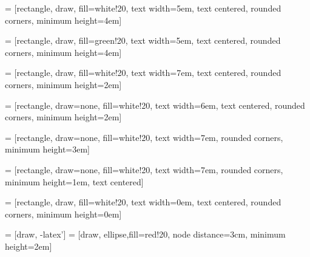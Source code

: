 \documentclass{article}
\begin{document}
\pagestyle{empty}



 = [rectangle, draw, fill=white!20, 
    text width=5em, text centered, rounded corners, minimum height=4em]

 = [rectangle, draw, fill=green!20, 
text width=5em, text centered, rounded corners, minimum height=4em]
    
 = [rectangle, draw, fill=white!20, 
text width=7em, text centered, rounded corners, minimum height=2em]

 = [rectangle, draw=none, fill=white!20, 
text width=6em, text centered, rounded corners, minimum height=2em]

 = [rectangle, draw=none, fill=white!20, 
text width=7em, rounded corners, minimum height=3em] %

 = [rectangle, draw=none, fill=white!20, 
text width=7em, rounded corners, minimum height=1em, text centered] %



 = [rectangle, draw, fill=white!20, 
text width=0em, text centered, rounded corners, minimum height=0em]


 = [draw, -latex']
 = [draw, ellipse,fill=red!20, node distance=3cm,
    minimum height=2em]
    
\end{document}
